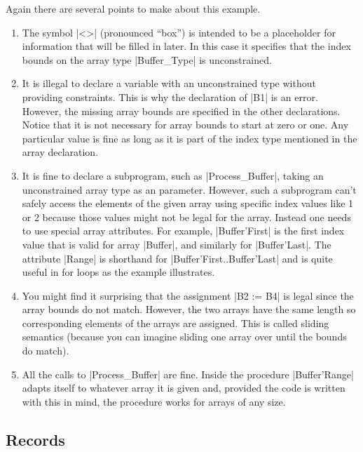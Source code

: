 Again there are several points to make about this example.

\begin{enumerate}

\item The symbol |<>| (pronounced “box”) is intended to be a placeholder for information that
  will be filled in later. In this case it specifies that the index bounds on the array type
  |Buffer_Type| is unconstrained.

\item It is illegal to declare a variable with an unconstrained type without providing
  constraints. This is why the declaration of |B1| is an error. However, the missing array
  bounds are specified in the other declarations. Notice that it is not necessary for array
  bounds to start at zero or one. Any particular value is fine as long as it is part of the
  index type mentioned in the array declaration.

\item It is fine to declare a subprogram, such as |Process_Buffer|, taking an unconstrained
  array type as an parameter. However, such a subprogram can't safely access the elements of the
  given array using specific index values like 1 or 2 because those values might not be legal
  for the array. Instead one needs to use special array attributes. For example, |Buffer'First|
  is the first index value that is valid for array |Buffer|, and similarly for |Buffer'Last|.
  The attribute |Range| is shorthand for |Buffer'First..Buffer'Last| and is quite useful in for
  loops as the example illustrates.

\item You might find it surprising that the assignment |B2 := B4| is legal since the array
  bounds do not match. However, the two arrays have the same length so corresponding elements of
  the arrays are assigned. This is called sliding semantics (because you can imagine sliding one
  array over until the bounds do match).

\item All the calls to |Process_Buffer| are fine. Inside the procedure |Buffer'Range| adapts
  itself to whatever array it is given and, provided the code is written with this in mind, the
  procedure works for arrays of any size.

\end{enumerate}

\subsection{Records}

